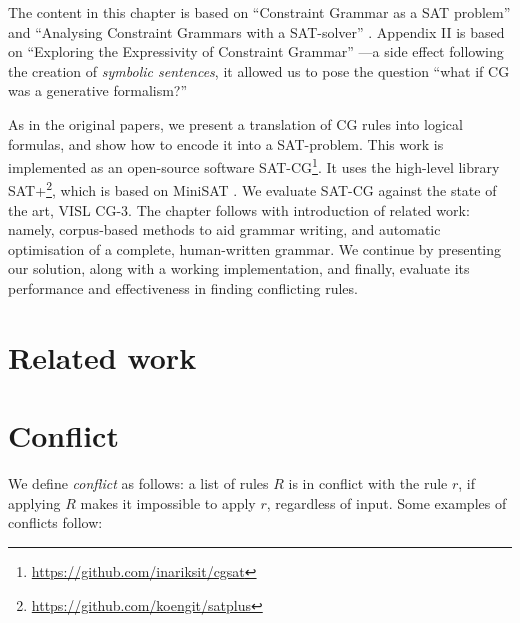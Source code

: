The content in this chapter is based on ``Constraint Grammar as a SAT
problem'' \cite{listenmaa_claessen2015} and ``Analysing Constraint
Grammars with a SAT-solver'' \cite{listenmaa_claessen2016}. Appendix
II is based on ``Exploring the Expressivity of Constraint
Grammar'' \cite{kokke2017expressivity}---a side effect following the
creation of \emph{symbolic sentences}, it allowed us to pose the question
``what if CG was a generative formalism?''

As in the original papers, we present a translation of CG rules into
logical formulas, and show how to encode it into a SAT-problem.  This
work is implemented as an open-source software
SAT-CG\footnote{\url{https://github.com/inariksit/cgsat}}. It uses the
high-level library
SAT+\footnote{\url{https://github.com/koengit/satplus}}, which is
based on MiniSAT \cite{een04sat}.  We evaluate SAT-CG against the
state of the art, VISL CG-3.  The chapter follows with introduction of
related work: namely, corpus-based methods to aid grammar writing, and
automatic optimisation of a complete, human-written grammar. We
continue by presenting our solution, along with a working
implementation, and finally, evaluate its performance and
effectiveness in finding conflicting rules.

\section{Related work}
\label{sec:cg-related-work}



\section{Conflict}
\label{sec:sectionCGana}


We define \emph{conflict} as follows: a list of rules $R$ is in
conflict with the rule $r$, if applying $R$ makes it impossible to
apply $r$, regardless of input.
Some examples of conflicts follow:

